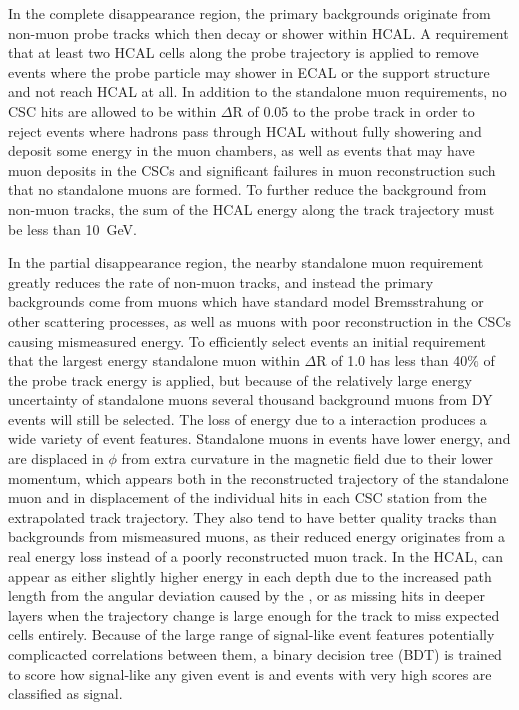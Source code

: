 In the complete disappearance region, the primary backgrounds originate from non-muon probe tracks which then decay or shower within HCAL. 
A requirement that at least two HCAL cells along the probe trajectory is applied to remove events where the probe particle may shower in ECAL or the support structure and not reach HCAL at all.
In addition to the standalone muon requirements, no CSC hits are allowed to be within $\Delta$R of 0.05 to the probe track in order to reject events where hadrons pass through HCAL without fully showering and deposit some energy in the muon chambers, as well as events that may have muon deposits in the CSCs and significant failures in muon reconstruction such that no standalone muons are formed.
To further reduce the background from non-muon tracks, the sum of the HCAL energy along the track trajectory must be less than \SI{10}{\giga\eV}. 

In the partial disappearance region, the nearby standalone muon requirement greatly reduces the rate of non-muon tracks, and instead the primary backgrounds come from muons which have standard model Bremsstrahung or other scattering processes, as well as muons with poor reconstruction in the CSCs causing mismeasured energy.
To efficiently select events an initial requirement that the largest energy standalone muon within $\Delta$R of 1.0 has less than 40$\%$ of the probe track energy is applied, but because of the relatively large energy uncertainty of standalone muons several thousand background muons from DY events will still be selected.
The loss of energy due to a \dbrem interaction produces a wide variety of event features.
Standalone muons in \dbrem events have lower energy, and are displaced in $\phi$ from extra curvature in the magnetic field due to their lower momentum, which appears both in the reconstructed trajectory of the standalone muon and in displacement of the individual hits in each CSC station from the extrapolated track trajectory.
They also tend to have better quality tracks than backgrounds from mismeasured muons, as their reduced energy originates from a real energy loss instead of a poorly reconstructed muon track.
In the HCAL, \dbrem can appear as either slightly higher energy in each depth due to the increased path length from the angular deviation caused by the \dbrem, or as missing hits in deeper layers when the trajectory change is large enough for the track to miss expected cells entirely.
Because of the large range of signal-like event features potentially complicacted correlations between them, a binary decision tree (BDT) is trained to score how signal-like any given event is and events with very high scores are classified as signal.

